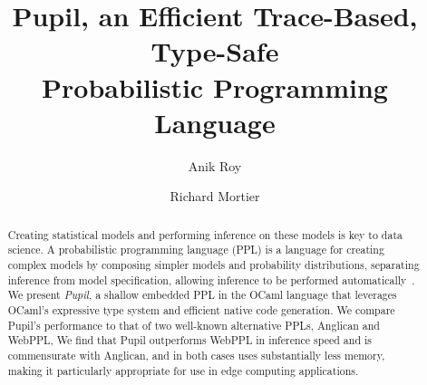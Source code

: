 \documentclass[sigconf]{acmart}
\newcommand{\pupil}{Pupil\xspace}
\begin{document}
\title[
  \pupil, an Efficient Trace-Based, Type-Safe Probabilistic Programming Language
]{
  \pupil, an Efficient Trace-Based, Type-Safe \\
  Probabilistic Programming Language
}

\author{Anik Roy}

\author{Richard Mortier}


\begin{abstract}
  Creating statistical models and performing inference on these models is key to data science. A probabilistic programming language (PPL) is a language for creating complex models by composing simpler models and probability distributions, separating inference from model specification, allowing inference to be performed automatically~\cite{gordon2014probabilistic}. We present \emph{\pupil}, a shallow embedded PPL in the OCaml language that leverages OCaml's expressive type system and efficient native code generation. We compare \pupil's performance to that of two well-known alternative PPLs, Anglican and WebPPL, We find that \pupil outperforms WebPPL in inference speed and is commensurate with Anglican, and in both cases uses substantially less memory, making it particularly appropriate for use in edge computing applications.
\end{abstract}
\end{document}
